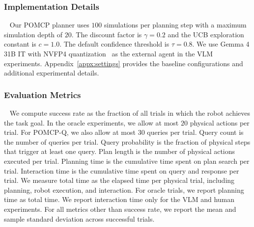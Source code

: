 \subsubsection{Implementation Details}~\label{exp:details}
Our POMCP planner uses $100$ simulations per planning step with a maximum simulation depth of $20$. The discount factor is $\gamma=0.2$ and the UCB exploration constant is $c=1.0$. The default confidence threshold is $\tau=0.8$. We use Gemma 4 31B IT with NVFP4 quantization~\citep{gemmateam2026gemma4} as the external agent in the VLM experiments. Appendix~\ref{appx:settings} provides the baseline configurations and additional experimental details.

\subsubsection{Evaluation Metrics}~\label{exp:metrics}
We compute success rate as the fraction of all trials in which the robot achieves the task goal. In the oracle experiments, we allow at most $20$ physical actions per trial. For POMCP-Q, we also allow at most $30$ queries per trial. Query count is the number of queries per trial. Query probability is the fraction of physical steps that trigger at least one query. Plan length is the number of physical actions executed per trial. Planning time is the cumulative time spent on plan search per trial. Interaction time is the cumulative time spent on query and response per trial. We measure total time as the elapsed time per physical trial, including planning, robot execution, and interaction. For oracle trials, we report planning time as total time. We report interaction time only for the VLM and human experiments. For all metrics other than success rate, we report the mean and sample standard deviation across successful trials.
